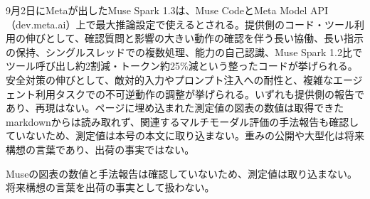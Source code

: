 9月2日にMetaが出したMuse Spark 1.3は、Muse CodeとMeta Model API（dev.meta.ai）上で最大推論設定で使えるとされる\cite{musespark}。提供側のコード・ツール利用の伸びとして、確認質問と影響の大きい動作の確認を伴う長い協働、長い指示の保持、シングルスレッドでの複数処理、能力の自己認識、Muse Spark 1.2比でツール呼び出し約2割減・トークン約25\%減という整ったコードが挙げられる。安全対策の伸びとして、敵対的入力やプロンプト注入への耐性と、複雑なエージェント利用タスクでの不可逆動作の調整が挙げられる。いずれも提供側の報告であり、再現はない。ページに埋め込まれた測定値の図表の数値は取得できたmarkdownからは読み取れず、関連するマルチモーダル評価の手法報告も確認していないため、測定値は本号の本文に取り込まない。重みの公開や大型化は将来構想の言葉であり、出荷の事実ではない。

\begin{technicalnote}[図表数値の扱い]
Museの図表の数値と手法報告は確認していないため、測定値は取り込まない。将来構想の言葉を出荷の事実として扱わない\cite{musespark}。
\end{technicalnote}
